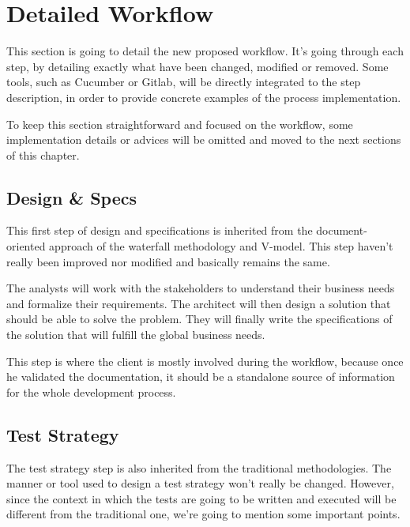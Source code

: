 \section{Detailed Workflow}\label{sec:detailed-workflow}

This section is going to detail the new proposed workflow.
It's going through each step, by detailing exactly what have been changed,
modified or removed.
Some tools, such as Cucumber or Gitlab, will be directly integrated to the
step description, in order to provide concrete examples of the process
implementation.

To keep this section straightforward and focused on the workflow, some
implementation details or advices will be omitted and moved to the next
sections of this chapter.

\subsection{Design \& Specs}\label{subsec:design-specs}
This first step of design and specifications is inherited from the
document-oriented approach of the waterfall methodology and V-model.
This step haven't really been improved nor modified and basically remains the
same.

The analysts will work with the stakeholders to understand their business
needs and formalize their requirements.
The architect will then design a solution that should be able to solve the
problem.
They will finally write the specifications of the solution that will fulfill
the global business needs.

This step is where the client is mostly involved during the workflow, because
once he validated the documentation, it should be a standalone source of
information for the whole development process.


\subsection{Test Strategy}\label{subsec:test-strategy}
The test strategy step is also inherited from the traditional methodologies.
The manner or tool used to design a test strategy won't really be changed.
However, since the context in which the tests are going to be written and
executed will be different from the traditional one, we're going to mention
some important points.

